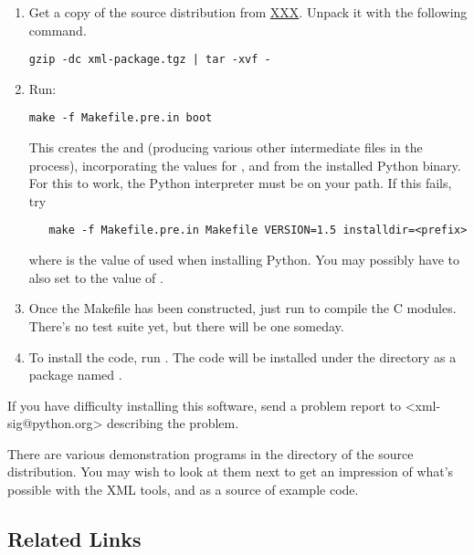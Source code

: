 \documentclass{howto}
\begin{document}
\begin{enumerate}
\item Get a copy of the source distribution from \url{XXX}.  Unpack it with the following command.

\begin{verbatim}
gzip -dc xml-package.tgz | tar -xvf -
\end{verbatim}

\item
 Run:
\begin{verbatim}
make -f Makefile.pre.in boot
\end{verbatim}

This creates the 
and
 (producing various other intermediate files in the process), incorporating the values for , 
and  from the installed Python binary.  For this to work,
the Python interpreter must be on your path.  If this fails, try

\begin{verbatim}
   make -f Makefile.pre.in Makefile VERSION=1.5 installdir=<prefix>
\end{verbatim}

where  is the value of  used when
installing Python.  You may possibly have to also set
 to the value of .

\item
 Once the Makefile has been constructed, just run  to
 compile the C modules.  There's no test suite yet, but there will be
 one someday.

\item
To install the code, run .
 The code will be installed under the  directory
 as a package named .  

\end{enumerate}

If you have difficulty installing this software, send a problem report
to <xml-sig@python.org> describing the problem.

There are various demonstration programs in the  directory
of the source distribution.  You may wish to look at them next to get
an impression of what's possible with the XML tools, and as a source
of example code.


\subsection{Related Links}
\end{document}
